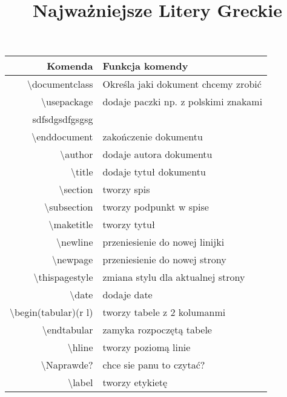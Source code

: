 \documentclass{article}
\begin{document}
\begin{center}
\large
\begin{tabular}{|r|l|}
\hline
Komenda & Funkcja komendy \\
\hline
\textbackslash documentclass & Określa jaki dokument chcemy zrobić\\
\textbackslash usepackage & dodaje paczki np. z polskimi znakami\\
sdfsdgsdfgsgsg\\
\textbackslash end{document} & zakończenie dokumentu \\
\textbackslash author & dodaje autora dokumentu \\
\textbackslash title & dodaje tytuł dokumentu \\
\textbackslash section & tworzy spis \\
\textbackslash subsection & tworzy podpunkt w spise \\
\textbackslash maketitle & tworzy tytuł \\
\textbackslash newline & przeniesienie do nowej linijki \\
\textbackslash newpage & przeniesienie do nowej strony \\
\textbackslash thispagestyle & zmiana stylu dla aktualnej strony \\
\textbackslash date & dodaje date \\
\textbackslash begin(tabular)(r l) & tworzy tabele z 2 kolumanmi \\
\textbackslash end{tabular} & zamyka rozpoczętą tabele \\
\textbackslash hline & tworzy poziomą linie \\
\textbackslash Naprawde? & chce sie panu to czytać? \\
\textbackslash label & tworzy etykietę \\
\hline



\end{tabular}
\end{center}
\begin{center}
\title{\Huge Najważniejsze Litery Greckie}
\maketitle
\end{center}
\end{document}
